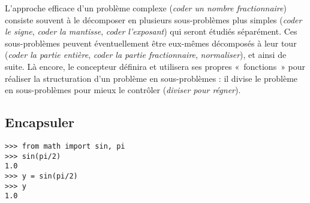 L'approche efficace d'un problème complexe ({\em coder un nombre fractionnaire})
consiste souvent à le décomposer en plusieurs sous-problèmes plus simples 
({\em coder le signe}, {\em coder la mantisse}, {\em coder l'exposant})
qui seront étudiés séparément.
Ces sous-problèmes peuvent éventuel\-lement être eux-mêmes décomposés à leur tour
({\em coder la partie entière}, {\em coder la partie fractionnaire}, {\em normaliser}), 
et ainsi de suite. Là encore, le concepteur définira et utilisera ses propres «~fonctions~» 
pour réaliser la structuration d'un problème en sous-problèmes : il divise le problème
en sous-problèmes pour mieux le contrôler ({\em diviser pour régner}).


\subsection{Encapsuler}
\begin{ex}
\hfill\begin{py}{7cm}
\begin{verbatim}
>>> from math import sin, pi
>>> sin(pi/2)
1.0
>>> y = sin(pi/2)
>>> y
1.0
\end{verbatim}
\end{py}
\end{ex}

